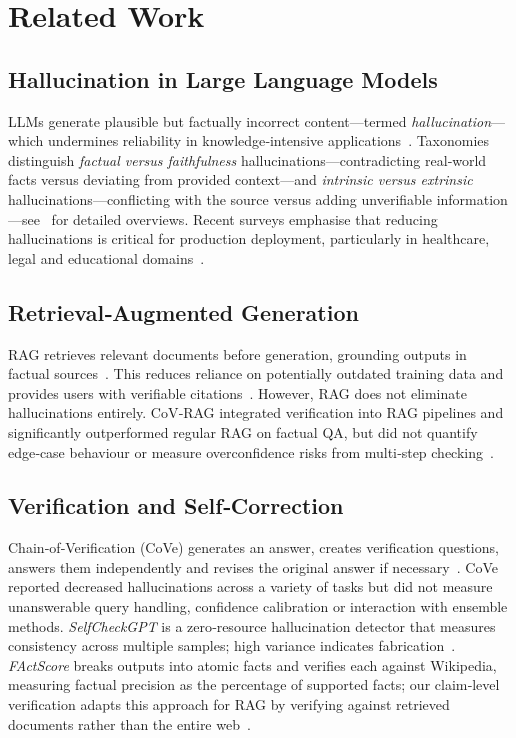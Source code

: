 \documentclass{article}
\begin{document}
\section{Related Work}
\label{sec:related}

\subsection{Hallucination in Large Language Models}

LLMs generate plausible but factually incorrect content—termed \emph{hallucination}—which undermines reliability in knowledge‑intensive applications~\cite{zhang2023siren,li2023halueval}. Taxonomies distinguish \emph{factual versus faithfulness} hallucinations—contradicting real‑world facts versus deviating from provided context—and \emph{intrinsic versus extrinsic} hallucinations—conflicting with the source versus adding unverifiable information—see~\cite{zhang2023siren,min2023factscore} for detailed overviews. Recent surveys emphasise that reducing hallucinations is critical for production deployment, particularly in healthcare, legal and educational domains~\cite{zhang2023siren,gao2023ragsurvey}.

\subsection{Retrieval‑Augmented Generation}

RAG retrieves relevant documents before generation, grounding outputs in factual sources~\cite{lewis2020rag,shuster2021retaug,gao2023ragsurvey}. This reduces reliance on potentially outdated training data and provides users with verifiable citations~\cite{menick2022gophercite}. However, RAG does not eliminate hallucinations entirely. CoV‑RAG integrated verification into RAG pipelines and significantly outperformed regular RAG on factual QA, but did not quantify edge‑case behaviour or measure overconfidence risks from multi‑step checking~\cite{he2024covrag}.

\subsection{Verification and Self‑Correction}

Chain‑of‑Verification (CoVe) generates an answer, creates verification questions, answers them independently and revises the original answer if necessary~\cite{dhuliawala2024cove,he2024covrag,cobbe2021verifiers}. CoVe reported decreased hallucinations across a variety of tasks but did not measure unanswerable query handling, confidence calibration or interaction with ensemble methods. \emph{SelfCheckGPT} is a zero‑resource hallucination detector that measures consistency across multiple samples; high variance indicates fabrication~\cite{manakul2023selfcheckgpt}. \emph{FActScore} breaks outputs into atomic facts and verifies each against Wikipedia, measuring factual precision as the percentage of supported facts; our claim‑level verification adapts this approach for RAG by verifying against retrieved documents rather than the entire web~\cite{min2023factscore}.
\end{document}
